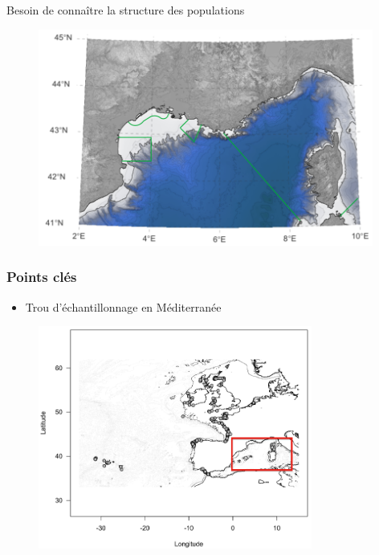 \documentclass[10pt,xcolor=table]{beamer}\usepackage[]{graphicx}\usepackage[]{color}
\begin{document}
\begin{frame}

	
Besoin de connaître la structure des populations

	\begin{figure}
		\begin{center}
		\includegraphics[width=11cm]{CarteAMPvertes}
		\end{center}
	\end{figure}
\end{frame}

\begin{frame}
	\frametitle{Points clés}
	\begin{itemize}
		\item Trou d'échantillonnage en Méditerranée
	\end{itemize}
	
	\begin{figure}
		\begin{center}
		\includegraphics[width=9cm]{ML2}
		\end{center}
	\end{figure}
\end{frame}
\end{document}
